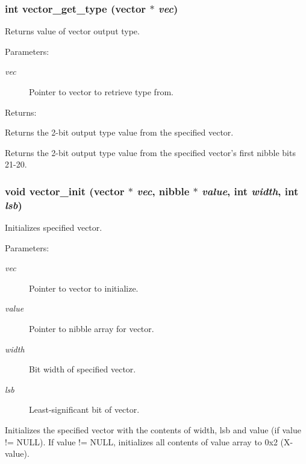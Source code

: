 \subsubsection{\setlength{\rightskip}{0pt plus 5cm}int vector\_\-get\_\-type ({\bf vector} $\ast$ {\em vec})}\label{vector_8h_a14}


Returns value of vector output type.

\begin{Desc}
\item[Parameters: ]\par
\begin{description}
\item[{\em 
vec}]Pointer to vector to retrieve type from.\end{description}
\end{Desc}
\begin{Desc}
\item[Returns: ]\par
Returns the 2-bit output type value from the specified vector.\end{Desc}
Returns the 2-bit output type value from the specified vector's first nibble bits 21-20. 
\subsubsection{\setlength{\rightskip}{0pt plus 5cm}void vector\_\-init ({\bf vector} $\ast$ {\em vec}, {\bf nibble} $\ast$ {\em value}, int {\em width}, int {\em lsb})}\label{vector_8h_a0}


Initializes specified vector.

\begin{Desc}
\item[Parameters: ]\par
\begin{description}
\item[{\em 
vec}]Pointer to vector to initialize. \item[{\em 
value}]Pointer to nibble array for vector. \item[{\em 
width}]Bit width of specified vector. \item[{\em 
lsb}]Least-significant bit of vector.\end{description}
\end{Desc}
Initializes the specified vector with the contents of width, lsb and value (if value != NULL). If value != NULL, initializes all contents  of value array to 0x2 (X-value). 
